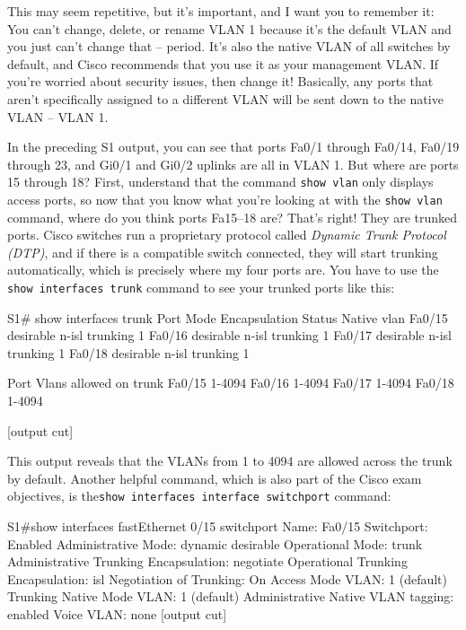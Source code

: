 This may seem repetitive, but it's important, and I want you to remember
it: You can't change, delete, or rename VLAN 1 because it's the default
VLAN and you just can't change that -- period. It's also the native VLAN
of all switches by default, and Cisco recommends that you use it as your
management VLAN. If you're worried about security issues, then change
it! Basically, any ports that aren't specifically assigned to a
different VLAN will be sent down to the native VLAN -- VLAN 1.

In the preceding S1 output, you can see that ports Fa0/1 through Fa0/14,
Fa0/19 through 23, and Gi0/1 and Gi0/2 uplinks are all in VLAN 1. But
where are ports 15 through 18? First, understand that the command
\texttt{show\ vlan} only displays access ports, so now that you know
what you're looking at with the \texttt{show\ vlan} command, where do
you think ports Fa15--18 are? That's right! They are trunked ports.
Cisco switches run a proprietary protocol called \emph{Dynamic Trunk
Protocol (DTP)}, and if there is a compatible switch connected, they
will start trunking automatically, which is precisely where my four
ports are. You have to use the \texttt{show\ interfaces\ trunk} command
to see your trunked ports like this:

\begin{cli}
S1# show interfaces trunk
Port        Mode             Encapsulation  Status        Native vlan
Fa0/15      desirable        n-isl          trunking      1
Fa0/16      desirable        n-isl          trunking      1
Fa0/17      desirable        n-isl          trunking      1
Fa0/18      desirable        n-isl          trunking      1

Port        Vlans allowed on trunk
Fa0/15      1-4094
Fa0/16      1-4094
Fa0/17      1-4094
Fa0/18      1-4094

[output cut]
\end{cli}

This output reveals that the VLANs from 1 to 4094 are allowed across the trunk by default.
Another helpful command, which is also part of the Cisco exam objectives, is the\texttt{show\ interfaces\ interface\ switchport} command:

\begin{cli}
S1#show interfaces fastEthernet 0/15 switchport
Name: Fa0/15
Switchport: Enabled
Administrative Mode: dynamic desirable
Operational Mode: trunk
Administrative Trunking Encapsulation: negotiate
Operational Trunking Encapsulation: isl
Negotiation of Trunking: On
Access Mode VLAN: 1 (default)
Trunking Native Mode VLAN: 1 (default)
Administrative Native VLAN tagging: enabled
Voice VLAN: none
[output cut]
\end{cli}


